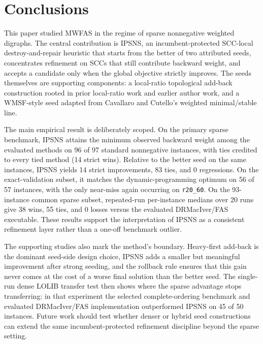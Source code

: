 \section{Conclusions}
\label{sec:conclusion}

This paper studied MWFAS in the regime of sparse nonnegative weighted digraphs. The central contribution is IPSNS, an incumbent-protected SCC-local destroy-and-repair heuristic that starts from the better of two attributed seeds, concentrates refinement on SCCs that still contribute backward weight, and accepts a candidate only when the global objective strictly improves. The seeds themselves are supporting components: a local-ratio topological add-back construction rooted in prior local-ratio work and earlier author work, and a WMSF-style seed adapted from Cavallaro and Cutello's weighted minimal/stable line.

The main empirical result is deliberately scoped. On the primary sparse benchmark, IPSNS attains the minimum observed backward weight among the evaluated methods on 96 of 97 standard nonnegative instances, with ties credited to every tied method (14 strict wins). Relative to the better seed on the same instances, IPSNS yields 14 strict improvements, 83 ties, and 0 regressions. On the exact-validation subset, it matches the dynamic-programming optimum on 56 of 57 instances, with the only near-miss again occurring on \texttt{r20\_60}. On the 93-instance common sparse subset, repeated-run per-instance medians over 20 runs give 38 wins, 55 ties, and 0 losses versus the evaluated DRMacIver/FAS executable. These results support the interpretation of IPSNS as a consistent refinement layer rather than a one-off benchmark outlier.

The supporting studies also mark the method's boundary. Heavy-first add-back is the dominant seed-side design choice, IPSNS adds a smaller but meaningful improvement after strong seeding, and the rollback rule ensures that this gain never comes at the cost of a worse final solution than the better seed. The single-run dense LOLIB transfer test then shows where the sparse advantage stops transferring: in that experiment the selected complete-ordering benchmark and evaluated DRMacIver/FAS implementation outperformed IPSNS on 45 of 50 instances. Future work should test whether denser or hybrid seed constructions can extend the same incumbent-protected refinement discipline beyond the sparse setting.
